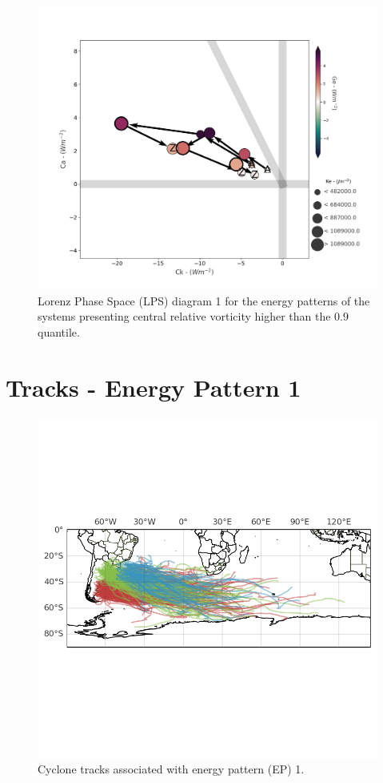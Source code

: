 \begin{figure}[!htbp]
\centering
\includegraphics[width=\textwidth]{figs_appendix/lps_mixed_all_systems_all_clusters_zoom.png}
\caption[LPS 1 - Most Intense Systems]{Lorenz Phase Space (LPS) diagram 1 for the energy patterns of the systems presenting central relative vorticity higher than the 0.9 quantile.}
\label{fig:lps_mixed_all_systems_all_clusters_zoom}
\end{figure}

\chapter{Tracks - Energy Pattern 1}\label{ap:09}

\begin{figure}[!htbp]
\centering
\includegraphics[width=\textwidth]{figs_appendix/tracks.png}
\caption[Tracks - EP1]{Cyclone tracks associated with energy pattern (EP) 1.}
\label{fig:tracks_ep1}
\end{figure}